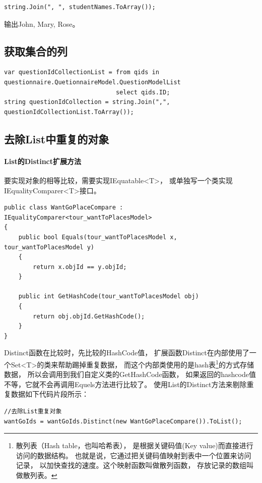 \documentclass{book}
\begin{document}
\begin{lstlisting}[language={[Sharp]C}]
string.Join(", ", studentNames.ToArray());
\end{lstlisting}

输出John, Mary, Rose。

\subsection{获取集合的列}

\begin{lstlisting}[language={[Sharp]C}]
var questionIdCollectionList = from qids in questionnaire.QuetionnaireModel.QuestionModelList
                               select qids.ID;
string questionIdCollection = string.Join(",", questionIdCollectionList.ToArray());
\end{lstlisting}

\subsection{去除List中重复的对象}

\paragraph{List的Distinct扩展方法}要实现对象的相等比较，需要实现IEquatable<T>，
或单独写一个类实现IEqualityComparer<T>接口。

\begin{lstlisting}[language={[Sharp]C}]
public class WantGoPlaceCompare : IEqualityComparer<tour_wantToPlacesModel>
{
    public bool Equals(tour_wantToPlacesModel x, tour_wantToPlacesModel y)
    {
        return x.objId == y.objId;
    }

    public int GetHashCode(tour_wantToPlacesModel obj)
    {
        return obj.objId.GetHashCode();
    }
}
\end{lstlisting}

Distinct函数在比较时，先比较的HashCode值，
扩展函数Distinct在内部使用了一个Set<T>的类来帮助踢掉重复数据，
而这个内部类使用的是hash表\footnote{散列表（Hash table，也叫哈希表），
是根据关键码值(Key value)而直接进行访问的数据结构。
也就是说，它通过把关键码值映射到表中一个位置来访问记录，
以加快查找的速度。这个映射函数叫做散列函数，
存放记录的数组叫做散列表。}的方式存储数据，
所以会调用到我们自定义类的GetHashCode函数，
如果返回的hashcode值不等，它就不会再调用Equels方法进行比较了。
使用List的Distinct方法来剔除重复数据如下代码片段所示：

\begin{lstlisting}[language={[Sharp]C}]
//去除List重复对象
wantGoIds = wantGoIds.Distinct(new WantGoPlaceCompare()).ToList();
\end{lstlisting}
\end{document}
